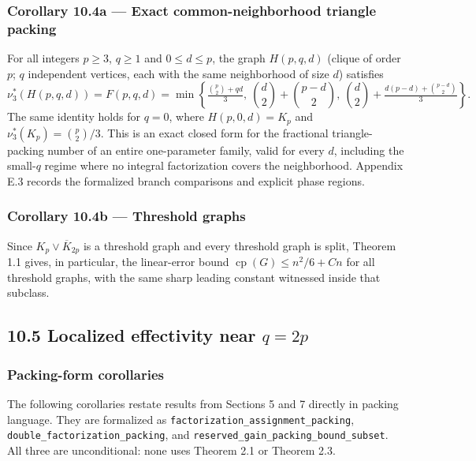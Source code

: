 \documentclass[
  american,
  11pt,
  a4paper,
]{article}
\newcounter{none} %
\begin{document}
\subsubsection{Corollary 10.4a --- Exact common-neighborhood triangle packing}\label{corollary-10.4a-exact-common-neighborhood-triangle-packing}

For all integers \(p\ge3\), \(q\ge1\) and \(0\le d\le p\), the graph \(H(p,q,d)\) (clique of order \(p\); \(q\) independent vertices, each with the same neighborhood of size \(d\)) satisfies \[
\nu_3^*(H(p,q,d))=F(p,q,d)=\min\left\{\tfrac{\binom p2+qd}{3},\ \binom d2+\binom{p-d}2,\ \binom d2+\tfrac{d(p-d)+\binom{p-d}2}{3}\right\}.
\] The same identity holds for \(q=0\), where \(H(p,0,d)=K_p\) and \(\nu_3^*(K_p)=\binom p2/3\). This is an exact closed form for the fractional triangle-packing number of an entire one-parameter family, valid for every \(d\), including the small-\(q\) regime where no integral factorization covers the neighborhood. Appendix E.3 records the formalized branch comparisons and explicit phase regions.

\subsubsection{Corollary 10.4b --- Threshold graphs}\label{corollary-10.4b-threshold-graphs}

Since \(K_p\vee\overline K_{2p}\) is a threshold graph and every threshold graph is split, Theorem 1.1 gives, in particular, the linear-error bound \(\operatorname{cp}(G)\le n^2/6+Cn\) for all threshold graphs, with the same sharp leading constant witnessed inside that subclass.

\subsection{\texorpdfstring{10.5 Localized effectivity near \(q=2p\)}{10.5 Localized effectivity near q=2p}}\label{localized-effectivity-near-q2p}

\subsubsection{Packing-form corollaries}\label{packing-form-corollaries}

The following corollaries restate results from Sections 5 and 7 directly in packing language. They are formalized as \texttt{factorization\_assignment\_packing}, \texttt{double\_factorization\_packing}, and \texttt{reserved\_gain\_packing\_bound\_subset}. All three are unconditional: none uses Theorem 2.1 or Theorem 2.3.
\end{document}
